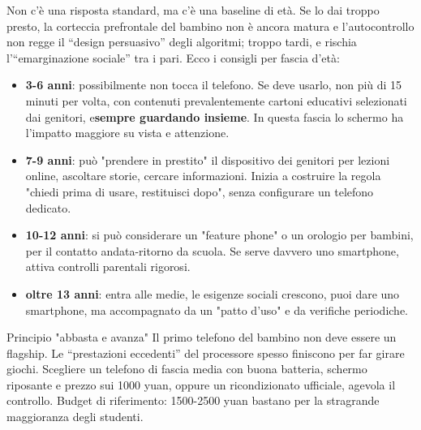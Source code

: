 


Non c'è una risposta standard, ma c'è una baseline di età. Se lo dai troppo presto, la corteccia prefrontale del bambino non è ancora matura e l'autocontrollo non regge il “design persuasivo” degli algoritmi; troppo tardi, e rischia l'“emarginazione sociale” tra i pari. Ecco i consigli per fascia d'età:

\begin{itemize}
  \item \textbf{3-6 anni}: possibilmente non tocca il telefono. Se deve usarlo, non più di 15 minuti per volta, con contenuti prevalentemente cartoni educativi selezionati dai genitori, e\textbf{sempre guardando insieme}. In questa fascia lo schermo ha l'impatto maggiore su vista e attenzione.
  \item \textbf{7-9 anni}: può "prendere in prestito" il dispositivo dei genitori per lezioni online, ascoltare storie, cercare informazioni. Inizia a costruire la regola "chiedi prima di usare, restituisci dopo", senza configurare un telefono dedicato.
  \item \textbf{10-12 anni}: si può considerare un "feature phone" o un orologio per bambini, per il contatto andata-ritorno da scuola. Se serve davvero uno smartphone, attiva controlli parentali rigorosi.
  \item \textbf{oltre 13 anni}: entra alle medie, le esigenze sociali crescono, puoi dare uno smartphone, ma accompagnato da un "patto d'uso" e da verifiche periodiche.
\end{itemize}

\begin{tcbinfo}{Principio "abbasta e avanza"}
Il primo telefono del bambino non deve essere un flagship. Le “prestazioni eccedenti” del processore spesso finiscono per far girare giochi. Scegliere un telefono di fascia media con buona batteria, schermo riposante e prezzo sui 1000 yuan, oppure un ricondizionato ufficiale, agevola il controllo. Budget di riferimento: 1500-2500 yuan bastano per la stragrande maggioranza degli studenti.

\end{tcbinfo}

